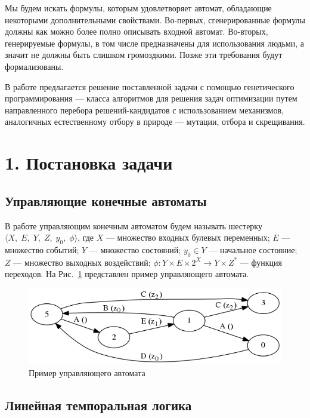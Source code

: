 \documentclass[12pt,fleqn]{article}
\begin{document}
Мы будем искать формулы, которым удовлетворяет автомат, обладающие некоторыми дополнительными свойствами.
Во-первых, сгенерированные формулы должны как можно более полно описывать входной автомат.
Во-вторых, генерируемые формулы, в том числе предназначены для использования людьми, а значит не должны быть слишком громоздкими.
Позже эти требования будут формализованы.

В работе предлагается решение поставленной задачи с помощью генетического программирования --- класса алгоритмов
для решения задач оптимизации путем направленного перебора решений-кандидатов с использованием механизмов, аналогичных естественному
отбору в природе --- мутации, отбора и скрещивания.

\section{1. Постановка задачи}

\subsection{Управляющие конечные автоматы}

В работе управляющим конечным автоматом будем называть шестерку $\langle X,\; E,\; Y,\; Z,\; y_0,\; \phi \rangle$,
где $X$ --- множество входных булевых переменных; $E$ --- множество событий; $Y$ --- множество состояний;
$y_0 \in Y$ --- начальное состояние; $Z$ --- множество выходных воздействий;
$\phi : Y \times E \times 2^X \rightarrow Y \times Z^*$ --- функция переходов. На Рис.~\ref{aut} представлен
пример управляющего автомата.

\begin{figure}[!hb]
  \centering
    \includegraphics[scale=0.5]{lift.png}
  \caption{Пример управляющего автомата}
  \label{aut}
\end{figure}

\subsection{Линейная темпоральная логика}
\end{document}
